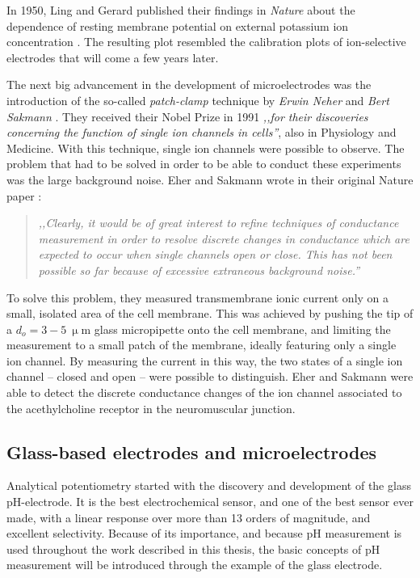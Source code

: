 In 1950, Ling and Gerard published their findings in \emph{Nature} about the dependence of resting membrane potential on external potassium ion concentration \cite{ling1950external}.
The resulting plot resembled the calibration plots of ion-selective electrodes that will come a few years later.

The next big advancement in the development of microelectrodes was the introduction of the so-called \emph{patch-clamp} technique by \emph{Erwin Neher} and \emph{Bert Sakmann} \cite{neher1976single, neher1978extracellular}.
They received their Nobel Prize in 1991 \emph{,,for their discoveries concerning the function of single ion channels in cells''}, also in Physiology and Medicine.
With this technique, single ion channels were possible to observe.
The problem that had to be solved in order to be able to conduct these experiments was the large background noise.
Eher and Sakmann wrote in their original Nature paper \cite{neher1976single}:

\begin{quote}
\vspace{0.5cm}
\emph{,,Clearly, it would be of great interest to refine techniques of conductance measurement in order to resolve discrete changes in conductance which are expected to occur when single channels open or close.
This has not been possible so far because of excessive extraneous background noise.''}
\vspace{0.5cm}
\end{quote} 

To solve this problem, they measured transmembrane ionic current only on a small, isolated area of the cell membrane.
This was achieved by pushing the tip of a $d_o = 3-5~\upmu$m glass micropipette onto the cell membrane, and limiting the measurement to a small patch of the membrane, ideally featuring only a single ion channel.
By measuring the current in this way, the two states of a single ion channel -- closed and open -- were possible to distinguish.
Eher and Sakmann were able to detect the discrete conductance changes of the ion channel associated to the acethylcholine receptor in the neuromuscular junction. 

\subsection{Glass-based electrodes and microelectrodes}
Analytical potentiometry started with the discovery and development of the glass pH-electrode. It is the best electrochemical sensor, and one of the best sensor ever made, with a linear response over more than 13 orders of magnitude, and excellent selectivity.
Because of its importance, and because pH measurement is used throughout the work described in this thesis, the basic concepts of pH measurement will be introduced through the example of the glass electrode.

